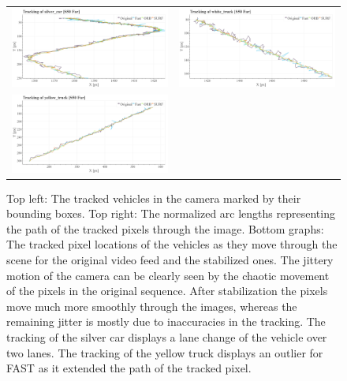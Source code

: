 \begin{figure}[!ht]
\begin{tabular}{cc}
    \includegraphics[width=0.475\linewidth]{diagrams/object_tracking/s50_s_far/silver_car.png}    &  
    \includegraphics[width=0.475\linewidth]{diagrams/object_tracking/s50_s_far/white_truck.png}    \\  
    \includegraphics[width=0.475\linewidth]{diagrams/object_tracking/s50_s_far/yellow_truck.png}   
  \end{tabular}
  \caption{Top left:
  The tracked vehicles in the camera  marked by their bounding boxes. 
  Top right: 
  The normalized arc lengths representing the path of the tracked pixels through the image.
  Bottom graphs:
  The tracked pixel locations of the vehicles as they move through the scene for the original video feed and the stabilized ones.
  The jittery motion of the camera can be clearly seen by the chaotic movement of the pixels in the original sequence.
  After stabilization the pixels move much more smoothly through the images, whereas the remaining jitter is mostly due to inaccuracies in the tracking. 
  The tracking of the silver car displays a lane change of the vehicle over two lanes.
  The tracking of the yellow truck displays an outlier for FAST as it extended the path of the tracked pixel.
  }
  \label{fig:object_tracking_appendix_s50_s_far}
\end{figure}

